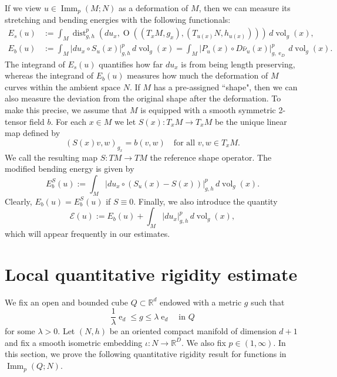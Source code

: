 \documentclass{article}
\numberwithin{equation}{section}
\theoremstyle{definition}
\theoremstyle{remark}
\DeclareMathOperator{\dist}{dist}
\DeclareMathOperator{\e}{e}
\DeclareMathOperator{\Imm}{Imm}
\DeclareMathOperator{\Ort}{O}
\DeclareMathOperator{\vol}{vol}
\begin{document}
If we view $u \in \Imm_p(M; N)$ as a deformation of $M$, then we can measure its stretching and bending energies with the following functionals:
\begin{align}
    E_s(u) &:= \int_M \dist_{g, h}^p(du_x, \Ort((T_xM, g_x), (T_{u(x)}N, h_{u(x)}))) \, d\vol_g(x), \\
    E_b(u) &:= \int_M |du_x \circ S_u(x)|_{g, h}^p \, d\vol_g(x) = \int_M |P_u(x) \circ D\bar{\nu}_u(x)|_{g, \e_D}^p \, d\vol_g(x).
\end{align}
The integrand of $E_s(u)$ quantifies how far $du_x$ is from being length preserving, whereas the integrand of $E_b(u)$ measures how much the deformation of $M$ curves within the ambient space $N$. If $M$ has a pre-assigned ``shape", then we can also measure the deviation from the original shape after the deformation. To make this precise, we assume that $M$ is equipped with a smooth symmetric 2-tensor field $b$. For each $x \in M$ we let $S(x) : T_xM \rightarrow T_xM$ be the unique linear map defined by
\begin{equation} \label{eq:reference_shape_operator}
    (S(x)v, w)_{g_x} = b(v, w) \quad \text{for all } v, w \in T_xM.
\end{equation}
We call the resulting map $S : TM \rightarrow TM$ the reference shape operator. The modified bending energy is given by
\begin{equation}
    E_b^S(u) := \int_M |du_x \circ (S_u(x) - S(x))|_{g, h}^p \, d\vol_g(x).
\end{equation}
Clearly, $E_b(u) = E_b^S(u)$ if $S \equiv 0$. Finally, we also introduce the quantity
\begin{equation} \label{eq:excess_energy}
    \mathcal{E}(u) := E_b(u) + \int_M |du_x|_{g, h}^p \, d\vol_g(x),
\end{equation}
which will appear frequently in our estimates.

\section{Local quantitative rigidity estimate} \label{sec:local_rigidity}

We fix an open and bounded cube $Q \subset \mathbb{R}^d$ endowed with a metric $g$ such that
\begin{equation} \label{eq:comparable_metrics}
    \frac{1}{\lambda} \e_d \le g \le \lambda \e_d \quad \text{in } Q
\end{equation}
for some $\lambda > 0$. Let $(N, h)$ be an oriented compact manifold of dimension $d + 1$ and fix a smooth isometric embedding $\iota : N \rightarrow \mathbb{R}^D$. We also fix $p \in (1, \infty)$. In this section, we prove the following quantitative rigidity result for functions in $\Imm_p(Q; N)$. 
\end{document}
